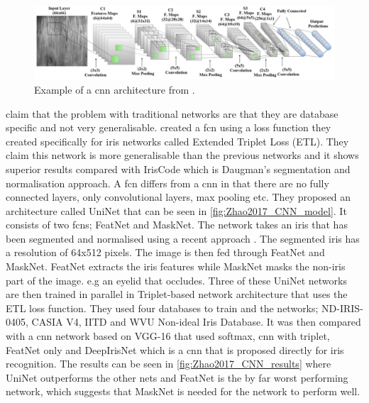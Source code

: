 \begin{figure}[H]
\centering
\includegraphics[width=\textwidth]{figures/Al_Waisy2017_CNN_model.png} 
\caption{Example of a \gls{cnn} architecture  from \cite{Al-Waisy2017}.}
\label{fig:Al_Waisy2017_CNN_model}
\end{figure}


\cite{Zhao2017} claim that the problem with traditional networks are that they are database specific and not very generalisable. \cite{Zhao2017} created a \gls{fcn} using a loss function they created specifically for iris networks called Extended Triplet Loss (ETL). They claim this network is more generalisable than the previous networks and it shows superior results compared with IrisCode which is Daugman's segmentation and normalisation approach. A \gls{fcn} differs from a \gls{cnn} in that there are no fully connected layers, only convolutional layers, max pooling etc. They proposed an architecture called UniNet that can be seen in \autoref{fig:Zhao2017_CNN_model}. It consists of two \gls{fcn}s; FeatNet and MaskNet. The network takes an iris that has been segmented and normalised using a recent approach \citep{Zhao2015a}. The segmented iris has a resolution of 64x512 pixels. The image is then fed through FeatNet and MaskNet. FeatNet extracts the iris features while MaskNet masks the non-iris part of the image. e.g an eyelid that occludes.  Three of these UniNet networks are then trained in parallel in Triplet-based network architecture that uses the ETL loss function. They used four databases to train and the networks; ND-IRIS-0405, CASIA V4, IITD and WVU Non-ideal Iris Database. It was then compared with a \gls{cnn} network based on VGG-16 that used softmax, \gls{cnn} with triplet, FeatNet only and DeepIrisNet which is a \gls{cnn} that is proposed directly for iris recognition. The results can be seen in \autoref{fig:Zhao2017_CNN_results} where UniNet outperforms the other nets and FeatNet is the by far worst performing network, which suggests that MaskNet is needed for the network to perform well. 

